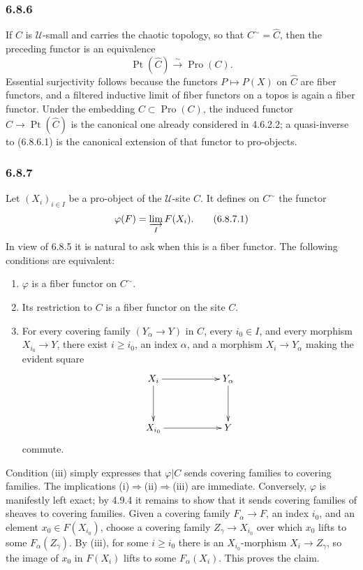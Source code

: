 \documentclass[11pt]{article}
\newcommand{\U}{\mathcal{U}}
\newcommand{\Ppoint}{\operatorname{Pt}}
\begin{document}
\subsubsection*{6.8.6}
If \(C\) is \(\U\)-small and carries the chaotic topology, so that \(C^{\sim}=\widehat C\), then the preceding functor is an equivalence
\begin{equation*}
\Ppoint(\widehat C)\xrightarrow{\sim}\operatorname{Pro}(C).\tag{6.8.6.1}
\end{equation*}
Essential surjectivity follows because the functors \(P\mapsto P(X)\) on \(\widehat C\) are fiber functors, and a filtered inductive limit of fiber functors on a topos is again a fiber functor. Under the embedding \(C\subset\operatorname{Pro}(C)\), the induced functor \(C\to\Ppoint(\widehat C)\) is the canonical one already considered in 4.6.2.2; a quasi-inverse to (6.8.6.1) is the canonical extension of that functor to pro-objects.

\subsubsection*{6.8.7}
Let \((X_i)_{i\in I}\) be a pro-object of the \(\U\)-site \(C\). It defines on \(C^{\sim}\) the functor
\begin{equation*}
\varphi(F)=\varinjlim_I F(X_i).\tag{6.8.7.1}
\end{equation*}
In view of 6.8.5 it is natural to ask when this is a fiber functor. The following conditions are equivalent:
\begin{enumerate}[label=(\roman*)]
\item \(\varphi\) is a fiber functor on \(C^{\sim}\).
\item Its restriction to \(C\) is a fiber functor on the site \(C\).
\item For every covering family \((Y_\alpha\to Y)\) in \(C\), every \(i_0\in I\), and every morphism \(X_{i_0}\to Y\), there exist \(i\ge i_0\), an index \(\alpha\), and a morphism \(X_i\to Y_\alpha\) making the evident square
\[
\xymatrix@C=2cm@R=1.25cm{X_i\ar[d]\ar[r]&Y_\alpha\ar[d]\\ X_{i_0}\ar[r]&Y}
\]
commute.
\end{enumerate}
Condition (iii) simply expresses that \(\varphi|C\) sends covering families to covering families. The implications (i)\(\Rightarrow\)(ii)\(\Rightarrow\)(iii) are immediate. Conversely, \(\varphi\) is manifestly left exact; by 4.9.4 it remains to show that it sends covering families of sheaves to covering families. Given a covering family \(F_\alpha\to F\), an index \(i_0\), and an element \(x_0\in F(X_{i_0})\), choose a covering family \(Z_\gamma\to X_{i_0}\) over which \(x_0\) lifts to some \(F_\alpha(Z_\gamma)\). By (iii), for some \(i\ge i_0\) there is an \(X_{i_0}\)-morphism \(X_i\to Z_\gamma\), so the image of \(x_0\) in \(F(X_i)\) lifts to some \(F_\alpha(X_i)\). This proves the claim.
\end{document}
